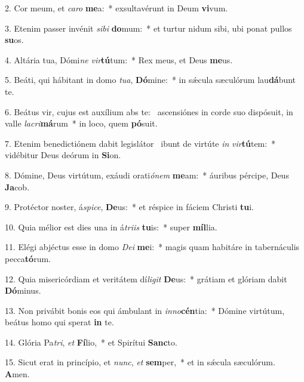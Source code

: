 2. Cor meum, et \textit{ca}\textit{ro} \textbf{me}a:~*  exsultavérunt in Deum \textbf{vi}vum.\

3. Etenim passer invénit \textit{si}\textit{bi} \textbf{do}mum:~*  et turtur nidum sibi, ubi ponat pullos \textbf{su}os.\

4. Altária tua, Dómi\textit{ne} \textit{vir}\textbf{tú}tum:~*  Rex meus, et Deus \textbf{me}us.\

5. Beáti, qui hábitant in domo \textit{tu}\textit{a}, \textbf{Dó}mine:~*  in sǽcula sæculórum lau\textbf{dá}bunt te.\

6. Beátus vir, cujus est auxílium abs te: \dag\  ascensiónes in corde suo dispósuit, in valle \textit{la}\textit{cri}\textbf{má}rum~*  in loco, quem \textbf{pó}suit.\

7. Etenim benedictiónem dabit legislátor \dag\  ibunt de virtúte \textit{in} \textit{vir}\textbf{tú}tem:~*  vidébitur Deus deórum in \textbf{Si}on.\

8. Dómine, Deus virtútum, exáudi orati\textit{ó}\textit{nem} \textbf{me}am:~*  áuribus pércipe, Deus \textbf{Ja}cob.\

9. Protéctor noster, á\textit{spi}\textit{ce}, \textbf{De}us:~*  et réspice in fáciem Christi \textbf{tu}i.\

10. Quia mélior est dies una in á\textit{tri}\textit{is} \textbf{tu}is:~*  super \textbf{míl}lia.\

11. Elégi abjéctus esse in domo \textit{De}\textit{i} \textbf{me}i:~*  magis quam habitáre in tabernáculis pecca\textbf{tó}rum.\

12. Quia misericórdiam et veritátem dí\textit{li}\textit{git} \textbf{De}us:~*  grátiam et glóriam dabit \textbf{Dó}minus.\

13. Non privábit bonis eos qui ámbulant in \textit{in}\textit{no}\textbf{cén}tia:~*  Dómine virtútum, beátus homo qui sperat \textbf{in} te.\

14. Glória Pa\textit{tri}, \textit{et} \textbf{Fí}lio,~*  et Spirítui \textbf{Sanc}to.\

15. Sicut erat in princípio, et \textit{nunc}, \textit{et} \textbf{sem}per,~*  et in sǽcula sæculórum. \textbf{A}men.\

